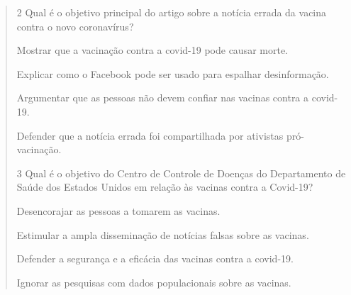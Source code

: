\begin{quote}
\num{2} Qual é o objetivo principal do artigo sobre a notícia errada da vacina
contra o novo coronavírus?

\begin{escolha}
\item Mostrar que a vacinação contra a covid-19 pode causar morte.

\item Explicar como o Facebook pode ser usado para espalhar desinformação.

\item Argumentar que as pessoas não devem confiar nas vacinas contra a covid-19.

\item Defender que a notícia errada foi compartilhada por ativistas pró-vacinação.
\end{escolha}


\num{3} Qual é o objetivo do Centro de Controle de Doenças do Departamento de Saúde dos Estados
Unidos em relação às vacinas contra a Covid-19?

\begin{escolha}
\item Desencorajar as pessoas a tomarem as vacinas.

\item Estimular a ampla disseminação de notícias falsas sobre as vacinas.

\item Defender a segurança e a eficácia das vacinas contra a covid-19.

\item Ignorar as pesquisas com dados populacionais sobre as vacinas.
\end{escolha}


\end{quote}
